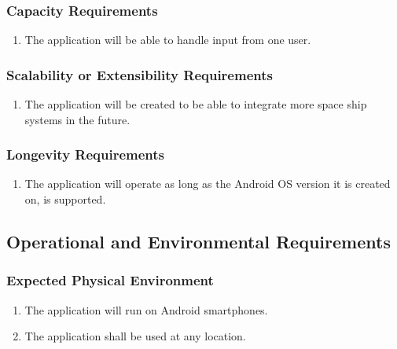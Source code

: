 \documentclass[12pt, titlepage]{article}
\begin{document}
\subsubsection{Capacity Requirements}
\label{ssub:capacity_requirements}
\begin{enumerate}[{PR}1. ]
	\item The application will be able to handle input from one user.
\end{enumerate}

\subsubsection{Scalability or Extensibility Requirements}
\label{ssub:scalability_or_extensibility_requirements}
\begin{enumerate}[{PR}1. ]
	\item The application will be created to be able to integrate more space ship systems in the future.
\end{enumerate}

\subsubsection{Longevity Requirements}
\label{ssub:longevity_requirements}
\begin{enumerate}[{PR}1. ]
	\item The application will operate as long as the Android OS version it is created on, is supported.
\end{enumerate}


\subsection{Operational and Environmental Requirements}
\label{sub:operational_and_environmental_requirements}

\subsubsection{Expected Physical Environment}
\label{ssub:expected_physical_environment}
\begin{enumerate}[{OE}1. ]
	\item The application will run on Android smartphones.
	\item The application shall be used at any location.
\end{enumerate}
\end{document}
